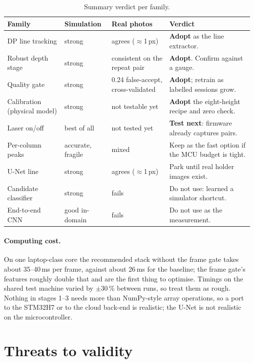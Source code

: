 \begin{table}[H]
\centering\small
\caption{Summary verdict per family.}\label{tab:verdicts}
\begin{tabularx}{\linewidth}{@{}lllX@{}}
\toprule
Family & Simulation & Real photos & Verdict \\
\midrule
DP line tracking & strong & agrees ($\approx$1\,px) & \textbf{Adopt} as the line extractor. \\
Robust depth stage & strong & consistent on the repeat pair & \textbf{Adopt}. Confirm against a gauge. \\
Quality gate & strong & 0.24 false-accept, cross-validated & \textbf{Adopt}; retrain as labelled sessions grow. \\
Calibration (physical model) & strong & not testable yet & \textbf{Adopt} the eight-height recipe and zero check. \\
Laser on/off & best of all & not tested yet & \textbf{Test next}: firmware already captures pairs. \\
Per-column peaks & accurate, fragile & mixed & Keep as the fast option if the MCU budget is tight. \\
U-Net line & strong & agrees ($\approx$1\,px) & Park until real holder images exist. \\
Candidate classifier & strong & fails & Do not use: learned a simulator shortcut. \\
End-to-end CNN & good in-domain & fails & Do not use as the measurement. \\
\bottomrule
\end{tabularx}
\end{table}

\paragraph{Computing cost.} On one laptop-class core the recommended stack without the frame gate takes about
35--40\,ms per frame, against about 26\,ms for the baseline; the frame gate's features roughly double that and are
the first thing to optimise. Timings on the shared test machine varied by $\pm30\,\%$ between runs, so treat them as
rough. Nothing in stages 1--3 needs more than NumPy-style array operations, so a port to the STM32H7 or to the
cloud back-end is realistic; the U-Net is not realistic on the microcontroller.



\section{Threats to validity}\label{sec:validity}


